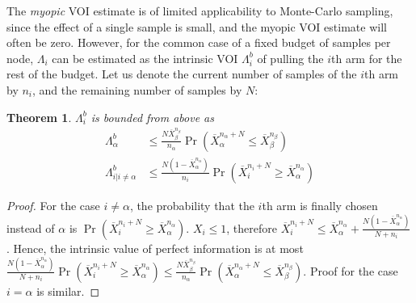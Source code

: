 \documentclass[]{article}
\newtheorem{thm}{Theorem}
\begin{document}
The \textit{myopic} VOI estimate is of limited applicability to
Monte-Carlo sampling, since the effect of a single sample is small,
and the myopic VOI estimate will often be zero. However, for the
common case of a fixed budget of samples per node, $\Lambda_i$ can be
estimated as the intrinsic VOI $\Lambda_i^b$ of pulling the $i$th arm
for the rest of the budget.  Let us denote the current number of
samples of the $i$th arm by $n_i$, and the remaining number of samples
by $N$:
\begin{thm} $\Lambda_i^b$ is bounded from above as
\begin{align}
\label{eqn:thm-be}
  \Lambda_\alpha^b&\le \frac {N \overline X_\beta^{n_\beta}} {n_\alpha} \Pr(\overline X_\alpha^{n_\alpha+N}\le\overline X_\beta^{n_\beta})\nonumber\\
\Lambda_{i|i\ne\alpha}^b&\le \frac {N(1-\overline X_\alpha^{n_\alpha})} {n_i}\Pr(\overline   X_i^{{n_i}+N}\ge\overline X_\alpha^{n_\alpha})
\end{align}
\label{thm:be}
\end{thm}
\vspace{-2em}
\begin{proof} For the case $i\ne \alpha$, the probability that the
  $i$th arm is finally chosen instead of $\alpha$ is
  $\Pr(\overline X_i^{n_i+N} \ge \overline X_\alpha^{n_\alpha})$. $X_i \le 1$,
  therefore $\overline X_i^{n_i+N}\le \overline
  X_\alpha^{n_\alpha}+\frac {N(1-\overline X_\alpha^{n_\alpha})} {N+n_i}$. Hence, the intrinsic value of perfect
  information is at most $\frac{ N(1-\overline  X_\alpha^{n_\alpha})}
  {N+n_i}\Pr(\overline X_i^{{n_i}+N}\ge\overline X_\alpha^{n_\alpha})\le \frac {N \overline X_\beta^{n_\beta}} {n_\alpha} \Pr(\overline X_\alpha^{n_\alpha+N}\le\overline X_\beta^{n_\beta})$.
  Proof for the case $i=\alpha$ is similar.
\end{proof}
\end{document}
